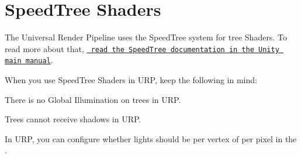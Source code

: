 \chapter{Speed\+Tree Shaders}
\hypertarget{md__hey_tea_9_2_library_2_package_cache_2com_8unity_8render-pipelines_8universal_0d14_80_88_2_documentation_0i_2speedtree}{}\label{md__hey_tea_9_2_library_2_package_cache_2com_8unity_8render-pipelines_8universal_0d14_80_88_2_documentation_0i_2speedtree}
\label{md__hey_tea_9_2_library_2_package_cache_2com_8unity_8render-pipelines_8universal_0d14_80_88_2_documentation_0i_2speedtree_autotoc_md2520}%
%
 The Universal Render Pipeline uses the Speed\+Tree system for tree Shaders. To read more about that, \href{https://docs.unity3d.com/Manual/SpeedTree.html}{\texttt{ read the Speed\+Tree documentation in the Unity main manual}}.

When you use Speed\+Tree Shaders in URP, keep the following in mind\+:


\begin{DoxyItemize}
\item There is no Global Illumination on trees in URP.
\item Trees cannot receive shadows in URP.
\item In URP, you can configure whether lights should be per vertex of per pixel in the . 
\end{DoxyItemize}
